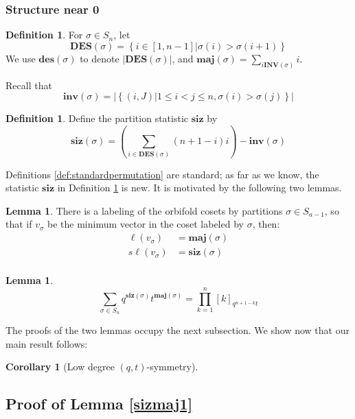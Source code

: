 \documentclass{amsart}[12pt]
\theoremstyle{definition}
\newtheorem{lemma}[dummy]{Lemma}
\newtheorem{corollary}[dummy]{Corollary}
\newtheorem{definition}[dummy]{Definition}
\newcommand{\sk}{s\ell}
\newcommand{\inv}{\mathbf{inv}}
\newcommand{\INV}{\mathbf{INV}}
\newcommand{\DES}{\mathbf{DES}}
\newcommand{\des}{\mathbf{des}}
\newcommand{\maj}{\mathbf{maj}}
\newcommand{\siz}{\mathbf{siz}}
\begin{document}
\subsubsection{Structure near 0}



\begin{definition} \label{def:standardpermutations}
For $\sigma\in S_n$, let 
$$\DES(\sigma)=\left\{i\in [1, n-1] \Big | \sigma(i)>\sigma(i+1)\right\}$$
We use $\des(\sigma)$ to denote $|\DES(\sigma)|$, and $\maj(\sigma)=\sum_{i\INV(\sigma)} i$.

Recall that 
$$\inv(\sigma)=\left|\left\{(i,J)\big| 1\leq i<j\leq n, \sigma(i)>\sigma(j)\right\}\right|$$
\end{definition}

\begin{definition} \label{def:sizepermutation}
Define the partition statistic $\siz$ by
$$\siz(\sigma)=\left(\sum_{i\in\DES(\sigma)} (n+1-i)i\right)-\inv(\sigma)$$
\end{definition}

Definitions \ref{def:standardpermutation} are standard; as far as we know, the statistic $\siz$ in Definition \ref{def:sizepermutation} is new.  It is motivated by the following two lemmas.

\begin{lemma} \label{lem:sizmaj1}
There is a labeling of the orbifold cosets by partitions $\sigma\in S_{a-1}$, so that if $v_\sigma$ be the minimum vector in the coset labeled by $\sigma$, then:
\begin{align*}
\ell(v_\sigma)&=\maj(\sigma) \\
\sk(v_\sigma)&=\siz(\sigma)\\
\end{align*}

\end{lemma}

\begin{lemma} \label{lem:sizmaj2}
$$\sum_{\sigma\in S_n} q^{\siz(\sigma)} t^{\maj(\sigma)}=\prod_{k=1}^n [k]_{q^{n+1-k}t}$$
\end{lemma}

The proofs of the two lemmas occupy the next subsection.  We show now that our main result follows:

\begin{corollary}[Low degree $(q,t)$-symmetry]

\end{corollary}

\subsection{Proof of Lemma \ref{sizmaj1}}
\end{document}
